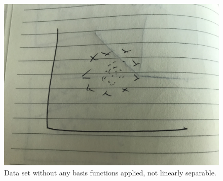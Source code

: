 \begin{figure}
    \centering
    \includegraphics[width=0.5\paperwidth]{../Classification/fig/circles_without_basis_change.jpg}
    \caption{Data set without any basis functions applied, not linearly separable.}
    \label{fig:circles-without-basis-change}
\end{figure}

